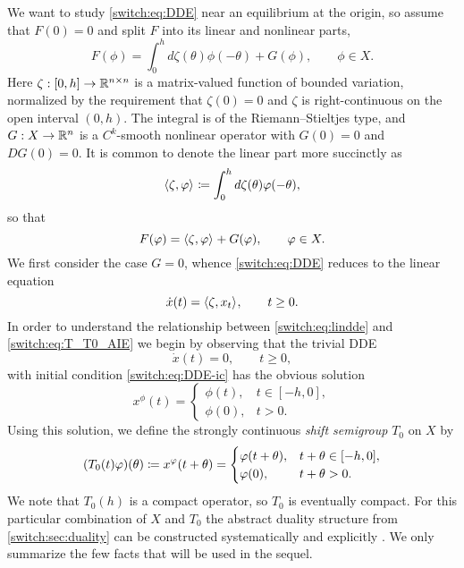 We want to study \cref{switch:eq:DDE} near an equilibrium at the origin, so assume that $F(0)=0$ and split $F$ into its linear and nonlinear parts,
%
\[
  F(\phi)=\int_0^h d\zeta(\theta) \phi(-\theta) + G(\phi), \qquad \phi \in X.
\]
%
Here $\zeta : [0,h] \to \mathbb{R}^{n \times n}$ is a matrix-valued function of bounded variation, normalized by the requirement that $\zeta(0) = 0$ and $\zeta$ is right-continuous on the open interval $(0,h)$. The integral is of the Riemann--Stieltjes type, and $G : X \to \mathbb{R}^n$ is a $C^k$-smooth nonlinear operator with $G(0) = 0$ and $DG(0) = 0$. It is common to denote the linear part more succinctly as
%
\begin{equation}
  \label{switch:eq:lindde_shorthand}
  \langle \zeta,\varphi \rangle_{} \coloneqq \int_0^h{d\zeta(\theta)\varphi(-\theta}),
\end{equation}
%
so that
%
\begin{equation}
  \label{switch:eq:DDE-RHS}
  F(\varphi) = \langle \zeta,\varphi \rangle_{} + G(\varphi),  \qquad \varphi \in X.
\end{equation}
%
We first consider the case $G = 0$, whence \cref{switch:eq:DDE} reduces to the linear equation
%
\begin{equation}
  \label{switch:eq:lindde}
  \dot{x}(t) = \langle \zeta,x_t \rangle_{}, \qquad t \ge 0.
\end{equation}
%
In order to understand the relationship between \cref{switch:eq:lindde} and \cref{switch:eq:T_T0_AIE} we begin by observing that the trivial DDE
%
\begin{equation}
  \label{switch:eq:trivialdde}
  \dot{x}(t) = 0, \qquad t \ge 0,
\end{equation}
%
with initial condition \cref{switch:eq:DDE-ic} has the obvious solution
%
\[
  x^{\phi}(t) =
  \begin{cases}
    \phi(t),& t \in [-h,0],\\
    \phi(0),& t > 0.
  \end{cases}
\]
%
Using this solution, we define the strongly continuous \emph{shift semigroup} $T_0$ on $X$ by
%
\begin{equation}
  \label{switch:eq:LDDE}
 (T_0(t)\varphi)(\theta) \coloneqq x^{\varphi}(t + \theta) =
  \begin{cases}
    \varphi(t + \theta),& t + \theta \in [-h,0],\\
    \varphi(0),& t + \theta > 0.
  \end{cases}
\end{equation}
%
We note that $T_0(h)$ is a compact operator, so $T_0$ is eventually compact. For this particular combination of $X$ and $T_0$ the abstract duality structure from \cref{switch:sec:duality} can be constructed systematically and explicitly \cite[Section II.5]{diekmann1995delay}. We only  summarize the few facts that will be used in the sequel.

